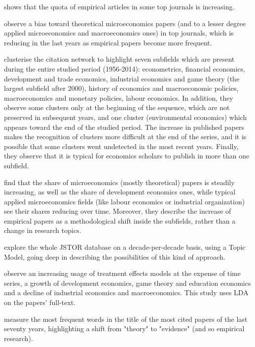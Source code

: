 \documentclass[a4paper, 11pt, headings=standardclasses, tablecaptionsbelow]{scrartcl}
\begin{document}
\textcite{hamermesh2013} shows that the quota of empirical articles in some top journals is increasing.

\textcite{card2013} observe a bias toward theoretical microeconomics papers (and to a lesser degree applied microeconomics and macroeconomics ones) in top journals, which is reducing in the last years as empirical papers become more frequent.

\textcite{claveau2016} clusterise the citation network to highlight seven subfields which are present during the entire studied period (1956-2014): econometrics, financial economics, development and trade economics, industrial economics and game theory (the largest subfield after 2000), history of economics and macroeconomic policies, macroeconomics and monetary policies, labour economics.
In addition, they observe some clusters only at the beginning of the sequence, which are not preserved in subsequent years, and one cluster (environmental economics) which appears toward the end of the studied period.
The increase in published papers makes the recognition of clusters more difficult at the end of the series, and it is possible that some clusters went undetected in the most recent years.
Finally, they observe that it is typical for economics scholars to publish in more than one subfield.

\textcite{angrist2017} find that the share of microeconomics (mostly theoretical) papers is steadily increasing, as well as the share of development economics ones, while typical applied microeconomics fields (like labour economics or industrial organization) see their shares reducing over time.
Moreover, they describe the increase of empirical papers as a methodological shift inside the subfields, rather than a change in research topics.

\textcite{ambrosino2018} explore the whole JSTOR database on a decade-per-decade basis, using a Topic Model, going deep in describing the possibilities of this kind of approach.

\textcite{fontana2019} observe an increasing usage of treatment effects models at the expense of time series, a growth of development economics, game theory and education economics and a decline of industrial economics and macroeconomics. This study uses LDA on the papers' full-text.

\textcite{montesinos2019} measure the most frequent words in the title of the most cited papers of the last seventy years, highlighting a shift from "theory" to "evidence" (and so empirical research).
\end{document}
